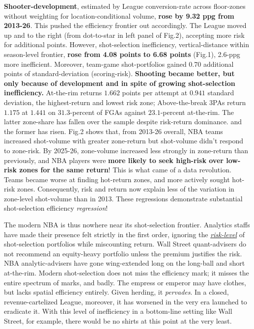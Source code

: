 \documentclass[10pt]{article}
\newcommand{\sect}[1]{\vspace{0pt}\noindent{\bfseries\color{navy}#1}\par\nobreak\vspace{-1pt}}
\begin{document}
\enlargethispage{7\baselineskip}%
\sect{3. Results}
\noindent
\textbf{Shooter-development}, estimated by League conversion-rate across floor-zones without weighting for location-conditional volume, \textbf{rose by 9.32 ppg from 2013-26}. This pushed the efficiency frontier out accordingly. The League moved up and to the right (from dot-to-star in left panel of Fig.2), accepting more risk for additional points. However, shot-selection inefficiency, vertical-distance within season-level frontier, \textbf{rose from 4.08 points to 6.68 points} (Fig.1), 2.6-ppg more inefficient. Moreover, team-game shot-portfolios gained 0.70 additional points of standard-deviation (scoring-risk). \textbf{Shooting became better, but only because of development and in spite of growing shot-selection inefficiency.} At-the-rim returns $1.662$ points per attempt at $0.941$ standard deviation, the highest-return and lowest risk zone; Above-the-break 3PAs return $1.175$ at $1.441$ on $31.3$-percent of FGAs against $23.1$-percent at-the-rim. The latter zone-share has fallen over the sample despite risk-return dominance. and the former has risen. Fig.2 shows that, from 2013-26 overall, NBA teams increased shot-volume with greater zone-return but shot-volume didn't respond to zone-risk. By 2025-26, zone-volume increased less strongly in zone-return than previously, and NBA players were \textbf{more likely to seek high-risk over low-risk zones for the same return}! This is what came of a data revolution. Teams became worse at finding hot-return zones, and more actively sought hot-risk zones. Consequently, risk and return now explain less of the variation in zone-level shot-volume than in 2013. These regressions demonstrate substantial shot-selection efficiency \emph{regression}! 

\sect{4. Conclusion}
\noindent
The modern NBA is thus nowhere near its shot-selection frontier. Analytics staffs have made their presence felt strictly in the first order, ignoring the \underline{\textit{risk-level}} of shot-selection portfolios while miscounting return. Wall Street quant-advisers do not recommend an equity-heavy portfolio unless the premium justifies the risk. NBA analytic-advisers have gone wing-extended long on the long-ball and short at-the-rim. Modern shot-selection does not miss the efficiency mark; it misses the entire spectrum of marks, and badly. The empress or emperor may have clothes, but lacks spatial efficiency entirely. Given herding, it \textit{pervades}. In a closed, revenue-cartelized League, moreover, it has worsened in the very era launched to eradicate it. With this level of inefficiency in a bottom-line setting like Wall Street, for example, there would be no shirts at this point at the very least. 
\end{document}

